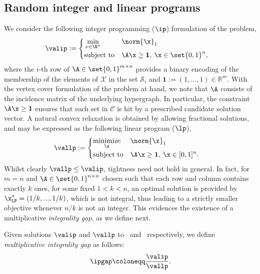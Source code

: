 \subsection{Random integer and linear programs}
We consider the following integer programming ($\ip$) formulation of the problem,
\begin{equation}
\label{def:ip}
\valip:=  
\begin{cases}
\begin{aligned}
& \min_{x \in \R^n}
& & \norm{\x}_1 \\
& \text{subject to}
& &  \A\x \geq \mathbf{1} , \: \x \in \set{0,1}^n,
\end{aligned}
\end{cases}
\end{equation}
where the $i$-th row of $\A \in \set{0,1}^{m\times n}$ provides a binary encoding of the membership of the elements of $\mathcal{X}$ in the set $\mathcal{S}_i$ and $\mathbf{1} := (1, \ldots, 1) \in \mathbb{R}^m$. With the vertex cover formulation of the problem at hand, we note that $\A$ consists of the incidence matrix of the underlying hypergraph.
In particular, the constraint \(\A\x \geq \mathbf{1}\) ensures that each set in $\mathcal{C}$ is hit by a prescribed candidate solution vector. A natural convex relaxation is obtained by allowing fractional solutions, and may be expressed as the following linear program ($\lp$),
\begin{equation}
\label{def:lp}
\vallp:=
\begin{cases}
\begin{aligned}
& \underset{\x}{\text{minimize}}
& & \norm{\x}_1 \\
& \text{subject to}
& & \A\x \geq \mathbf{1}, \:  \x \in [0,1]^n.
\end{aligned}
\end{cases}
\end{equation}
Whilst clearly $\vallp\leq \valip$, tightness need not hold in general. In fact, for $m = n$ and $\A \in \set{0,1}^{n\times n}$ chosen such that each row and column contains exactly $k$ ones, for some fixed $1 < k < n$, an optimal solution is provided by $\x^*_{\texttt{LP}}=\left(1/k,...,1/k\right)$, which is not integral, thus leading to a strictly smaller objective whenever $n / k$ is not an integer. This evidences the existence of a multiplicative \emph{integrality gap}, as we define next.
\begin{definition}
    Given solutions \(\valip\) and \(\vallp\) to~ and~ respectively, we define \emph{multiplicative integrality gap} as follows:
    \begin{equation}
        \ipgap \coloneqq \frac{\valip}{\vallp}.
    \end{equation}
\end{definition}
